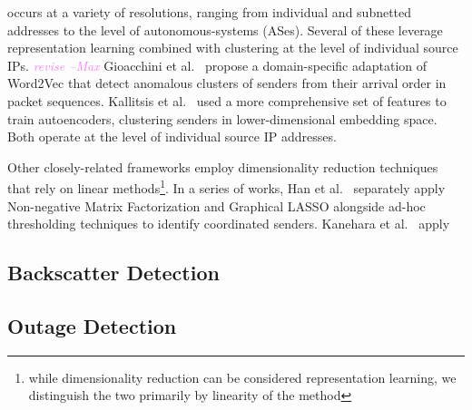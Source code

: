 \documentclass[manuscript,nonacm]{acmart}
\newcommand{\maxnote}[1]{\textit{\textcolor{violet}{#1 --Max}}}
\begin{document}
 occurs at a variety of resolutions, ranging from individual and subnetted addresses to the level of autonomous-systems (ASes).
Several of these leverage representation learning combined with clustering at the level of individual source IPs. \maxnote{revise}
Gioacchini et al.~\cite{@@} propose a domain-specific adaptation of Word2Vec that detect anomalous clusters of senders from their arrival order in packet sequences. 
Kallitsis et al.~\cite{@@} used a more comprehensive set of features to train autoencoders, clustering senders in lower-dimensional embedding space.
Both operate at the level of individual source IP addresses. 

Other closely-related frameworks employ dimensionality reduction techniques that rely on linear methods\footnote{while dimensionality reduction can be considered representation learning, we distinguish the two primarily by linearity of the method}.
In a series of works, Han et al.~\cite{@@} separately apply Non-negative Matrix Factorization and Graphical LASSO alongside ad-hoc thresholding techniques to identify coordinated senders.
Kanehara et al.~\cite{@@} apply 





\vspace{0.25em}


\subsection{Backscatter Detection}


\subsection{Outage Detection}
\end{document}
